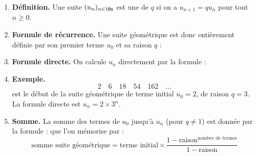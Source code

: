 \documentclass[11pt,class=report,crop=false]{standalone}
\begin{document}
\begin{cours}




\begin{enumerate}
  \item \textbf{Définition.} Une suite $(u_n)_{n\in\Nn}$ est une  de  $q$ si on a $u_{n+1} = q u_n$ pour tout $n\ge0$.
  

  
  \item \textbf{Formule de récurrence.} Une suite géométrique est donc entièrement définie par son premier terme $u_0$ et sa raison $q$ :
  


  
  \item \textbf{Formule directe.} On calcule $u_n$ directement par la formule :
  
  
  \item \textbf{Exemple.}
  $$2 \quad 6 \quad 18 \quad 54 \quad 162 \quad \ldots$$
  est le début de la suite géométrique de terme initial $u_0 = 2$, de raison $q=3$. La formule directe est $u_n = 2 \times 3^n$.
  
  \item \textbf{Somme.} La somme des termes de $u_0$ jusqu'à $u_n$ (pour $q\neq1$)  est donnée par la formule :
  que l'on mémorise par :
  $$\text{somme suite géométrique} = \text{terme initial} \times \frac{1 - \text{raison}^{\text{nombre de termes}}}{1-\text{raison}}$$
\end{enumerate}  
\end{cours}


\end{document}
